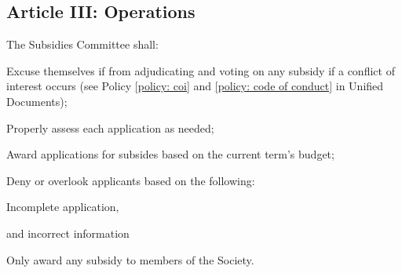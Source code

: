 \subsection{Article III: Operations}
\begin{longenum}[ label*=\thesubsection.\arabic*., align=left] 
	\item The Subsidies Committee shall:	
		\begin{longenum}[ label*=\arabic*., align=left] 
		\item Excuse themselves if from adjudicating and voting on any subsidy if a conflict of interest occurs (see Policy \ref{policy: coi} and \ref{policy: code of conduct} in Unified Documents);
		\item Properly assess each application as needed;
		\item Award applications for subsides based on the current term’s budget;
		\item Deny or overlook applicants based on the following:
			\begin{longenum}[ label*=\arabic*., align=left]
			\item Incomplete application, %
			\item and incorrect information
			\end{longenum}
		\item Only award any subsidy to members of the Society.	
		\end{longenum}
\end{longenum}

